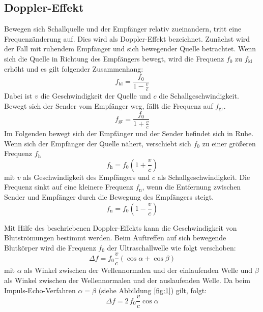 \subsection{Doppler-Effekt}
Bewegen sich Schallquelle und der Empfänger relativ zueinandern, tritt eine Frequenzänderung auf. Dies wird als Doppler-Effekt bezeichnet.
Zunächst wird der Fall mit ruhendem Empfänger und sich bewegender Quelle betrachtet. Wenn sich die Quelle in Richtung des Empfängers bewegt, wird die Frequenz $f_0$ zu $f_\mathrm{kl}$ erhöht und es gilt folgender Zusammenhang:
\begin{equation}
  f_\mathrm{kl} = \frac{f_0}{1-\frac{v}{c}}
\end{equation}
Dabei ist $v$ die Geschwindigkeit der Quelle und $c$ die Schallgeschwindigkeit.
Bewegt sich der Sender vom Empfänger weg, fällt die Frequenz auf $f_\mathrm{gr}$.
\begin{equation}
  f_\mathrm{gr} = \frac{f_0}{1+\frac{v}{c}}
\end{equation}
Im Folgenden bewegt sich der Empfänger und der Sender befindet sich in Ruhe. Wenn sich der Empfänger der Quelle nähert, verschiebt sich $f_0$ zu einer größeren Frequenz $f_\mathrm{h}$
\begin{equation}
  f_\mathrm{h} = f_0\left(1+\frac{v}{c}\right)
\end{equation}
mit  $v$ als Geschwindigkeit des Empfängers und $c$ als Schallgeschwindigkeit.
Die Frequenz sinkt auf eine kleinere Frequenz $f_\mathrm{n}$, wenn die Entfernung zwischen Sender und Empfänger durch die Bewegung des Empfängers steigt.
\begin{equation}
  f_\mathrm{n} =f_0\left(1-\frac{v}{c}\right)
\end{equation}

Mit Hilfe des beschriebenen Doppler-Effekts kann die Geschwindigkeit von Blutströmungen bestimmt werden. Beim Auftreffen auf sich bewegende Blutkörper wird die Frequenz $f_0$ der Ultraschallwelle wie folgt verschoben:
\begin{equation}
  \Delta f = f_0 \frac{v}{c}(\cos\alpha + \cos\beta)
\end{equation}
mit $\alpha$ als Winkel zwischen der Wellennormalen und der einlaufenden Welle und $\beta$ als Winkel zwischen der Wellennormalen und der auslaufenden Welle. Da beim Impuls-Echo-Verfahren $\alpha = \beta$ (siehe Abbildung \ref{fig:1}) gilt, folgt:
\begin{equation}
  \label{eqn:delta_f}
  \Delta f = 2\,f_0\frac{v}{c}\cos\alpha
\end{equation}

